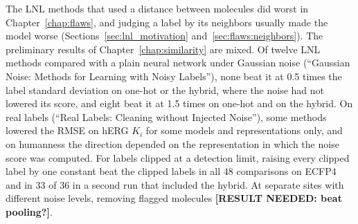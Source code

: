 The LNL methods that used a distance between molecules did worst in Chapter~\ref{chap:flaws}, and judging a label by its neighbors usually made the model worse (Sections~\ref{sec:lnl_motivation} and~\ref{sec:flaws:neighbors}). The preliminary results of Chapter~\ref{chap:similarity} are mixed. Of twelve LNL methods compared with a plain neural network under Gaussian noise (``Gaussian Noise: Methods for Learning with Noisy Labels''), none beat it at 0.5 times the label standard deviation on one-hot or the hybrid, where the noise had not lowered its score, and eight beat it at 1.5 times on one-hot and on the hybrid. On real labels (``Real Labels: Cleaning without Injected Noise''), some methods lowered the RMSE on hERG $K_i$ for some models and representations only, and on humanness the direction depended on the representation in which the noise score was computed. For labels clipped at a detection limit, raising every clipped label by one constant beat the clipped labels in all 48 comparisons on ECFP4 and in 33 of 36 in a second run that included the hybrid. At separate sites with different noise levels, removing flagged molecules \textbf{[RESULT NEEDED: beat pooling?]}.


